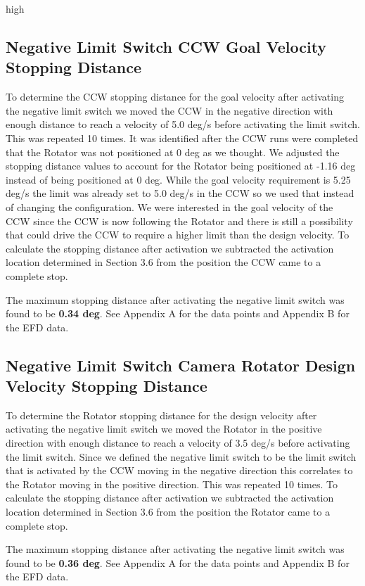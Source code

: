high\documentclass[SE,lsstdraft,authoryear,toc]{lsstdoc}
\begin{document}
\subsection{Negative Limit Switch CCW Goal Velocity Stopping Distance}

To determine the CCW stopping distance for the goal velocity after
activating the negative limit switch we moved the CCW in the negative
direction with enough distance to reach a velocity of 5.0 deg/s before
activating the limit switch. This was repeated 10 times. It was
identified after the CCW runs were completed that the Rotator was not
positioned at 0 deg as we thought. We adjusted the stopping distance
values to account for the Rotator being positioned at -1.16 deg instead
of being positioned at 0 deg. While the goal velocity requirement is
5.25 deg/s the limit was already set to 5.0 deg/s in the CCW so we used
that instead of changing the configuration. We were interested in the
goal velocity of the CCW since the CCW is now following the Rotator and
there is still a possibility that could drive the CCW to require a
higher limit than the design velocity. To calculate the stopping
distance after activation we subtracted the activation location
determined in Section 3.6 from the position the CCW came to a complete
stop.

The maximum stopping distance after activating the negative limit switch
was found to be \textbf{0.34 deg}. See Appendix A for the data points
and Appendix B for the EFD data.

\subsection{Negative Limit Switch Camera Rotator Design Velocity Stopping Distance}

To determine the Rotator stopping distance for the design velocity after
activating the negative limit switch we moved the Rotator in the
positive direction with enough distance to reach a velocity of 3.5 deg/s
before activating the limit switch. Since we defined the negative limit
switch to be the limit switch that is activated by the CCW moving in the
negative direction this correlates to the Rotator moving in the positive
direction. This was repeated 10 times. To calculate the stopping
distance after activation we subtracted the activation location
determined in Section 3.6 from the position the Rotator came to a
complete stop.

The maximum stopping distance after activating the negative limit switch
was found to be \textbf{0.36 deg}. See Appendix A for the data points
and Appendix B for the EFD data.
\end{document}
